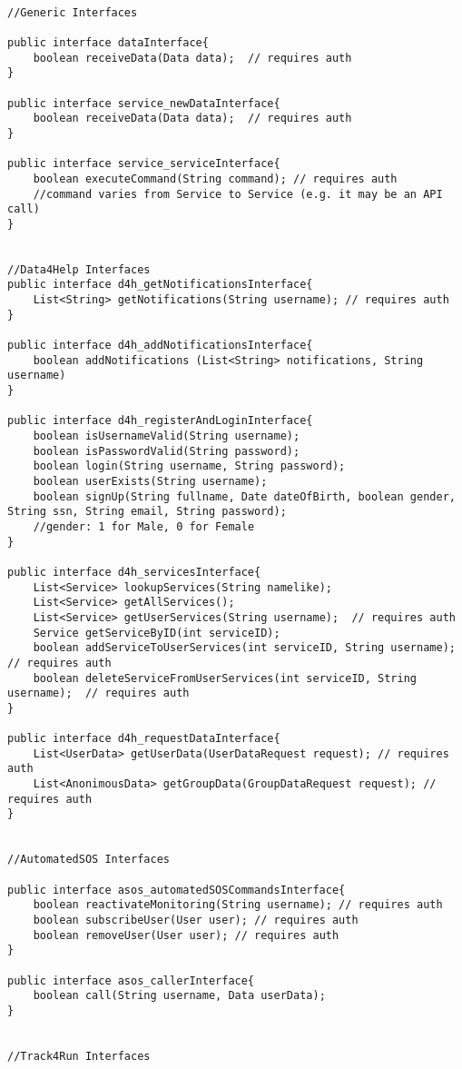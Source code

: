 \documentclass[../../DD.tex]{subfiles}
\begin{document}
\begin{lstlisting}

//Generic Interfaces

public interface dataInterface{
	boolean receiveData(Data data);  // requires auth
}

public interface service_newDataInterface{
	boolean receiveData(Data data);  // requires auth
}

public interface service_serviceInterface{
	boolean executeCommand(String command);	// requires auth
	//command varies from Service to Service (e.g. it may be an API call) 
}


//Data4Help Interfaces
public interface d4h_getNotificationsInterface{
	List<String> getNotifications(String username);	// requires auth
}

public interface d4h_addNotificationsInterface{
	boolean addNotifications (List<String> notifications, String username)
}

public interface d4h_registerAndLoginInterface{
	boolean isUsernameValid(String username);
	boolean isPasswordValid(String password);
	boolean login(String username, String password);
	boolean userExists(String username);
	boolean signUp(String fullname, Date dateOfBirth, boolean gender, String ssn, String email, String password);
	//gender: 1 for Male, 0 for Female
}

public interface d4h_servicesInterface{
	List<Service> lookupServices(String namelike);
	List<Service> getAllServices();
	List<Service> getUserServices(String username);  // requires auth
	Service getServiceByID(int serviceID);
	boolean addServiceToUserServices(int serviceID, String username);  // requires auth
	boolean deleteServiceFromUserServices(int serviceID, String username);  // requires auth
}

public interface d4h_requestDataInterface{
	List<UserData> getUserData(UserDataRequest request); // requires auth
	List<AnonimousData> getGroupData(GroupDataRequest request); // requires auth
}


//AutomatedSOS Interfaces

public interface asos_automatedSOSCommandsInterface{
	boolean reactivateMonitoring(String username); // requires auth
	boolean subscribeUser(User user); // requires auth
	boolean removeUser(User user); // requires auth
}

public interface asos_callerInterface{
	boolean call(String username, Data userData);
}


//Track4Run Interfaces


\end{lstlisting}
\end{document}
